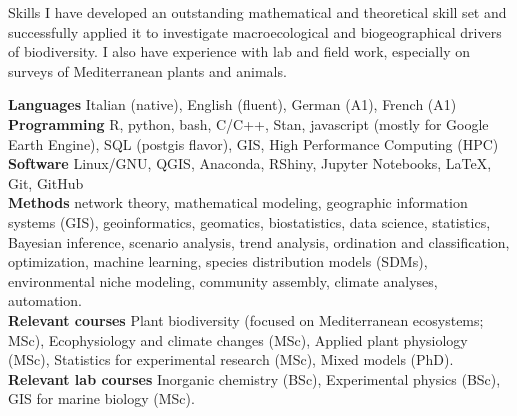 \documentclass{resume} %
\begin{document}
\begin{rSection}{Skills}
I have developed an outstanding mathematical and theoretical skill set and successfully applied it to investigate macroecological and biogeographical drivers of biodiversity.
I also have experience with lab and field work, especially on surveys of Mediterranean plants and animals.

{\bf Languages} Italian (native), English (fluent), German (A1), French (A1)\\
{\bf Programming} R, python, bash, C/C++, Stan, javascript (mostly for Google Earth Engine), SQL (postgis flavor), GIS, High Performance Computing (HPC)\\
{\bf Software} Linux/GNU, QGIS, Anaconda, RShiny, Jupyter Notebooks, \LaTeX, Git, GitHub\\
{\bf Methods} 
network theory,
mathematical modeling,
geographic information systems (GIS),
geoinformatics,
geomatics,
biostatistics,
data science,
statistics,
Bayesian inference,
scenario analysis,
trend analysis,
ordination and classification,
optimization,
machine learning,
species distribution models (SDMs),
environmental niche modeling,
community assembly,
climate analyses,
automation.\\
{\bf Relevant courses} Plant biodiversity (focused on Mediterranean ecosystems; MSc), Ecophysiology and climate changes (MSc), Applied plant physiology (MSc), Statistics for experimental research (MSc), Mixed models (PhD).\\
{\bf Relevant lab courses} Inorganic chemistry (BSc), Experimental physics (BSc), GIS for marine biology (MSc).
\end{rSection}

\clearpage
\end{document}
